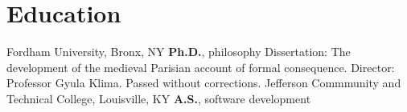 \vspace*{0.4cm}
\section{Education}
	{%
		Fordham University, Bronx, NY}
	{%
		\textbf{Ph.D.}, philosophy}
	{%
	Dissertation: The development of the medieval Parisian account of formal consequence. Director: Professor Gyula Klima. Passed without corrections.}
{%
	Jefferson Commmunity and Technical College, Louisville, KY}
{%
	\textbf{A.S.}, software development}
{}